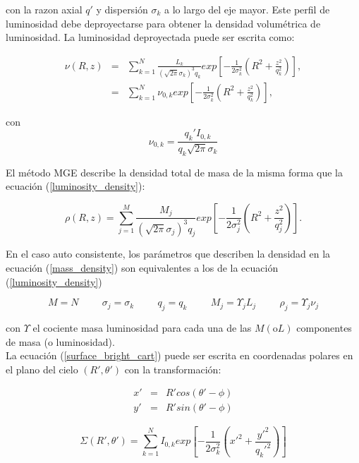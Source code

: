 con la razon axial $q'$ y dispersión $\sigma_k$ a lo largo del eje mayor. Este perfil de luminosidad debe deproyectarse para obtener la densidad volumétrica de luminosidad. La luminosidad deproyectada puede ser escrita como:

\begin{eqnarray}
\label{luminosity_density}
\nu (R,z) &=& \sum_{k=1}^{N} \frac{L_k}{(\sqrt{2\pi} \sigma_k)^3 q_k} exp \left[ -\frac{1}{2\sigma_k^2} \left( R^2 + \frac{z^2}{q_k^2} \right) \right ], \\
   &=& \sum_{k=1}^{N} \nu_{0,k} exp \left[ -\frac{1}{2\sigma_k^2} \left( R^2 + \frac{z^2}{q_k^2} \right) \right ],
\end{eqnarray}

con $$ \nu_{0,k} = \frac{ q_k' I_{0, k} }{ q_k \sqrt{2\pi} \sigma_k } $$



El método MGE describe la densidad total de masa de la misma forma que la ecuación (\ref{luminosity_density}):

\begin{equation}
\label{mass_density}
\rho (R,z) = \sum_{j=1}^{M} \frac{M_j}{(\sqrt{2\pi} \sigma_j)^3 q_j} exp \left[ -\frac{1}{2\sigma_j^2} \left( R^2 + \frac{z^2}{q_j^2} \right) \right ].
\end{equation}

En el caso auto consistente, los parámetros que describen la densidad en la ecuación (\ref{mass_density}) son equivalentes a los de la ecuación (\ref{luminosity_density})

$$ M=N \hspace{1cm} \sigma_j=\sigma_k  \hspace{1cm} q_j = q_k \hspace{1cm} M_j = \Upsilon_j L_j \hspace{1cm} \rho_j = \Upsilon_j \nu_j  $$

con $\Upsilon$ el cociente masa luminosidad para cada una de las $M (\textrm{o} L)$ componentes de masa (o luminosidad).\\


La ecuación (\ref{surface_bright_cart}) puede ser escrita en coordenadas polares en el plano del cielo $(R', \theta ')$ con la transformación:

\begin{eqnarray}
x' &=& R' cos(\theta ' - \phi) \\
y' &=& R' sin(\theta ' - \phi)
\end{eqnarray}

\begin{equation}
\label{surface_bright_polar}
\Sigma(R', \theta ') = \sum_{k=1}^{N} I_{0,k} exp \left[ -\frac{1}{2\sigma_k^2} \left( x'^2 + \frac{y'^2}{q_k'^2} \right) \right ]
\end{equation}

